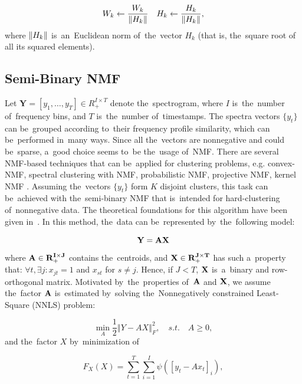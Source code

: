 \begin{equation}
  W_{k} \leftarrow \frac{W_{k}}{\left\lVert H_{k}\right\rVert}
  \quad
  H_{k} \leftarrow \frac{H_{k}}{\left\lVert H_{k}\right\rVert},
\end{equation}
where $\left\lVert H_{k}\right\rVert$ is~an~Euclidean norm of~the~vector $H_{k}$ (that is, the~square root 
of all its squared elements).

\subsection{Semi-Binary NMF}\label{ap_sbnmf}

Let $\mathbf{Y}=\left[ y_1,\dots,y_T\right]\in R^{I\times T}_+ $ denote the~spectrogram, where $I$ is~the~number of~frequency bins, and $T$ is~the~number of~timestamps. The spectra vectors $\{y_t\}$ can be~grouped according to~their frequency profile similarity, which can be~performed in~many ways. Since all the~vectors are nonnegative and could be~sparse, a~good choice seems to~be the~usage of~NMF. There are several NMF-based techniques that can be~applied for clustering problems, e.g. convex-NMF, spectral clustering with NMF, probabilistic NMF, projective NMF, kernel NMF \cite{zdunek2008data,wang2013nonnegative,ding2010convex}. Assuming the~vectors $\{y_t\}$ form $K$ disjoint clusters, this task can be~achieved with the~semi-binary NMF that is~intended for hard-clustering of~nonnegative data. The theoretical foundations for this algorithm have been given in~\cite{cichocki2009nonnegative}. In this method, the~data can be~represented by~the~following model: 

\begin{equation}
  \bf{Y}=\bf{AX}
\end{equation}
where $\bf{A}\in R^{I\times J}_+$ contains the~centroids, and $\bf{X}\in R^{J\times T}_+$ has such a~property that: $\forall t,\exists j:x_{jt}=1$ and $x_{st}$ for $s\neq j$. Hence, if $J<T$, $\bf{X}$ is~a~binary and row-orthogonal matrix. Motivated by~the~properties of~$\bf{A}$ and $\bf{X}$, we assume the~factor $\bf{A}$ is~estimated by~solving the~Nonnegatively constrained Least-Square (NNLS) problem: 

\begin{equation}\label{p2}
  \min_A{\frac{1}{2}\left\Vert{Y-AX}\right\Vert^2_F}, \quad s.t. \quad A\geq 0,
\end{equation}
and the~factor $X$ by~minimization of~

\begin{equation}\label{p3}
  F_X(X)=\sum_{t=1}^T\sum_{i=1}^I \psi\left( \left[y_t-Ax_t \right]_i\right),
\end{equation}

